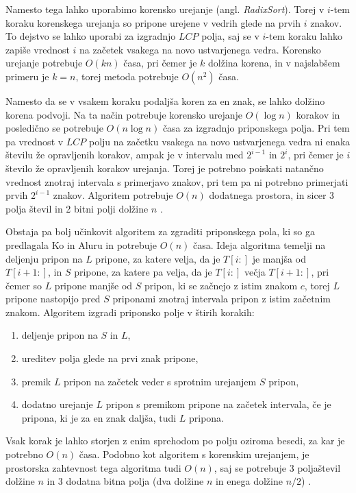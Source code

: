 Namesto tega lahko uporabimo korensko urejanje (angl. \textit{RadixSort}). Torej v $i$-tem koraku korenskega urejanja so pripone urejene v vedrih glede na prvih $i$ znakov. To dejstvo se lahko uporabi za izgradnjo $LCP$ polja, saj se v $i$-tem koraku lahko zapiše vrednost $i$ na začetek vsakega na novo ustvarjenega vedra. Korensko urejanje potrebuje $O(kn)$ časa, pri čemer je $k$ dolžina korena, in v najslabšem primeru je $k=n$, torej metoda potrebuje $O(n^2)$ časa.

Namesto da se v vsakem koraku podaljša koren za en znak, se lahko dolžino korena podvoji. Na ta način potrebuje korensko urejanje $O(\log{n})$ korakov in posledično se potrebuje $O(n\log{n})$ časa za izgradnjo priponskega polja. Pri tem pa vrednost v $LCP$ polju na začetku vsakega na novo ustvarjenega vedra ni enaka številu že opravljenih korakov, ampak je v intervalu med $2^{i-1}$ in $2^{i}$, pri čemer je $i$ število že opravljenih korakov urejanja. Torej je potrebno poiskati natančno vrednost znotraj intervala s primerjavo znakov, pri tem pa ni potrebno primerjati prvih $2^{i-1}$ znakov. Algoritem potrebuje $O(n)$ dodatnega prostora, in sicer 3 polja števil in 2 bitni polji dolžine $n$ \cite{Manber1990}.


Obstaja pa bolj učinkovit algoritem za zgraditi priponskega pola, ki so ga predlagala Ko in Aluru \cite{Ko2005} in potrebuje $O(n)$ časa. Ideja algoritma temelji na deljenju pripon na $L$ pripone, za katere velja, da je  $T[i:]$ je manjša od $T[i+1:]$, in $S$ pripone, za katere pa velja, da je $T[i:]$ večja $T[i+1:]$, pri čemer so $L$ pripone manjše od $S$ pripon, ki se začnejo z istim znakom $c$, torej $L$ pripone nastopijo pred $S$ priponami znotraj intervala pripon z istim začetnim znakom. Algoritem izgradi priponsko polje v štirih korakih:
\begin{enumerate}
    \item deljenje pripon na $S$ in $L$,
    \item ureditev polja glede na prvi znak pripone,
    \item premik $L$ pripon na začetek veder s sprotnim urejanjem $S$ pripon,
    \item dodatno urejanje $L$ pripon s premikom pripone na začetek intervala, če je pripona, ki je za en znak daljša, tudi $L$ pripona.
\end{enumerate}
Vsak korak je lahko storjen z enim sprehodom po polju oziroma besedi, za kar je potrebno $O(n)$ časa. Podobno kot algoritem s korenskim urejanjem, je prostorska zahtevnost tega algoritma tudi $O(n)$, saj se potrebuje 3 poljaštevil dolžine $n$ in 3 dodatna bitna polja (dva dolžine $n$ in enega dolžine $n/2$) \cite{Ko2005}.